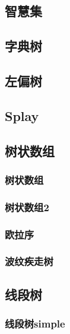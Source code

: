\subsection{智慧集}


\subsection{字典树}

\subsection{左偏树}

\subsection{Splay}


\subsection{树状数组}
\subsubsection{树状数组}


\subsubsection{树状数组2}


\subsubsection{欧拉序}

\subsubsection{波纹疾走树}


\subsection{线段树}
\subsubsection{线段树simple}


